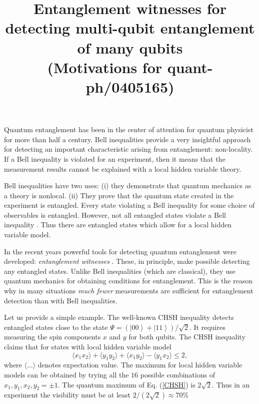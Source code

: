 \documentclass[pra,amsmath,amssymb]{revtex4}
\newcommand{\ket}[1]{\ensuremath{\left|{#1}\right\rangle}}
\def\be{\begin{equation}}
\def\ee{\end{equation}}
\newcommand{\exs}[1]{\ensuremath{\langle{#1}\rangle}}
\begin{document}
\title{Entanglement witnesses for detecting multi-qubit entanglement of many
  qubits\\(Motivations for quant-ph/0405165)}


\maketitle

Quantum entanglement has been in the center of attention for
quantum physicist for more than half a century. Bell inequalities 
\cite{B64,M90,GB98}
provide a very insightful approach for detecting an important
characteristic arising from entanglement: non-locality. If a Bell
inequality is violated for an experiment, then it means that the
measurement results cannot be explained with a local hidden
variable theory.

Bell inequalities have two uses: (i) they demonstrate that quantum
mechanics as a theory is nonlocal. (ii) They prove that the
quantum state created in the experiment is entangled. Every state
violating a Bell inequality for some choice of observables  is
entangled. However, not all entangled states violate a Bell
inequality \cite{W89}. Thus there are entangled states which allow for a
local hidden variable model.

In the recent years powerful tools for detecting quantum
entanglement were developed: {\it entanglement witnesses} \cite{HH90}. These,
in principle, make possible detecting any entangled states. Unlike
Bell inequalities (which are classical), they use quantum
mechanics for obtaining conditions for entanglement. This is the
reason why in many situations {\it much fewer} measurements are
sufficient for entanglement detection than with Bell inequalities.

Let us provide a simple example. The well-known CHSH inequality
detects entangled states close to the state
$\Psi=(\ket{00}+\ket{11})/\sqrt{2}$. It requires measuring the
spin components $x$ and $y$ for both qubits. The CHSH inequality
claims that for states with local hidden variable model \be
\exs{x_1x_2}+\exs{y_1y_2}+\exs{x_1y_2}-\exs{y_1x_2}\le 2, \label{CHSH} \ee 
where $\exs{...}$ denotes expectation value.
The maximum
for local hidden variable models can be obtained by trying all the
$16$ possible combinations of $x_1,y_1,x_2,y_2=\pm 1$. The quantum
maximum of Eq. (\ref{CHSH}) is $2\sqrt{2}$.
Thus in an experiment the visibility must be
at least $2/(2\sqrt{2})\approx 70\%$
\end{document}
